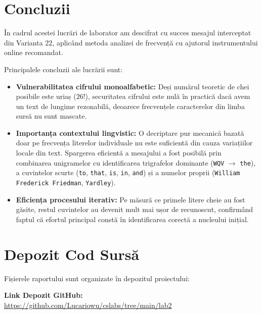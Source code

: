 \documentclass{labreport}
\begin{document}
\section{Concluzii}

În cadrul acestei lucrări de laborator am descifrat cu succes mesajul interceptat din Varianta 22, aplicând metoda analizei de frecvență cu ajutorul instrumentului online recomandat.

Principalele concluzii ale lucrării sunt:
\begin{itemize}[leftmargin=*]
    \item \textbf{Vulnerabilitatea cifrului monoalfabetic:} Deși numărul teoretic de chei posibile este uriaș ($26!$), securitatea cifrului este nulă în practică dacă avem un text de lungime rezonabilă, deoarece frecvențele caracterelor din limba sursă nu sunt mascate.
    \item \textbf{Importanța contextului lingvistic:} O decriptare pur mecanică bazată doar pe frecvența literelor individuale nu este suficientă din cauza variațiilor locale din text. Spargerea eficientă a mesajului a fost posibilă prin combinarea unigramelor cu identificarea trigrafelor dominante (\texttt{WQV} $\to$ \texttt{the}), a cuvintelor scurte (\texttt{to}, \texttt{that}, \texttt{is}, \texttt{in}, \texttt{and}) și a numelor proprii (\texttt{William Frederick Friedman}, \texttt{Yardley}).
    \item \textbf{Eficiența procesului iterativ:} Pe măsură ce primele litere cheie au fost găsite, restul cuvintelor au devenit mult mai ușor de recunoscut, confirmând faptul că efortul principal constă în identificarea corectă a nucleului inițial.
\end{itemize}

\section{Depozit Cod Sursă}

Fișierele raportului sunt organizate în depozitul proiectului:

\begin{center}
    \textbf{Link Depozit GitHub:}\\
    \url{https://github.com/Lucariowu/cslabs/tree/main/lab2}
\end{center}
\end{document}
